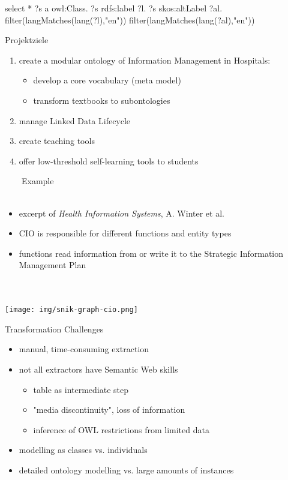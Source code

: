 \documentclass[aspectratio=1610,12pt]{beamer}
\begin{document}
select *
{
 ?s a owl:Class.
 ?s rdfs:label ?l.
 ?s skos:altLabel ?al.
 filter(langMatches(lang(?l),"en"))
 filter(langMatches(lang(?al),"en"))
}

\begin{frame}{Projektziele}
\begin{enumerate}
\item create a modular ontology of Information Management in Hospitals:
\begin{itemize}
\item develop a core vocabulary (meta model)
\item transform textbooks to subontologies 
\end{itemize}
\item manage Linked Data Lifecycle 
\item create teaching tools
\item offer low-threshold self-learning tools to students
\end{enumerate}
\end{frame}



\begin{frame}[plain]{~~~~Example}
~\\~\\
\begin{itemize}
\item excerpt of \emph{Health Information Systems}, A. Winter et al.
\item CIO is responsible for different functions and entity types
\item functions read information from or write it to the Strategic Information Management Plan
\end{itemize}
~\\~\\
\centering\texttt{[image: img/snik-graph-cio.png]}
\end{frame}
\restoregeometry


\begin{frame}{Transformation Challenges}
\begin{itemize}
\item manual, time-consuming extraction
\item not all extractors have Semantic Web skills 
\begin{itemize}
\item table as intermediate step
\item "media discontinuity", loss of information
\item inference of OWL restrictions from limited data 
\end{itemize}
\item modelling as classes vs. individuals
\item detailed ontology modelling vs. large amounts of instances 
\end{itemize}
\end{frame}
\end{document}

